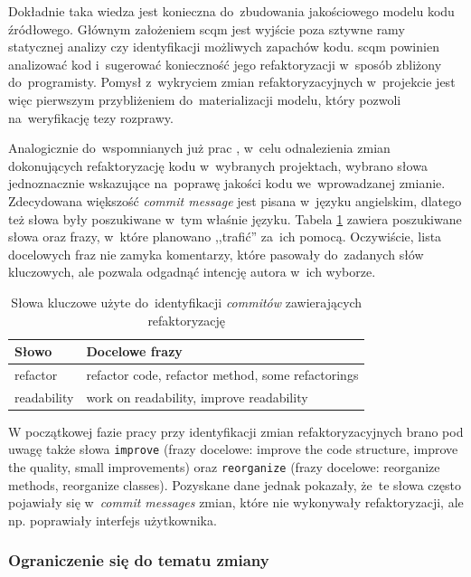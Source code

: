 \documentclass[twoside]{praca}
\begin{document}
Dokładnie taka wiedza jest konieczna do~zbudowania jakościowego modelu kodu źródłowego. Głównym założeniem \gls{scqm} jest wyjście poza sztywne ramy statycznej analizy czy identyfikacji możliwych zapachów kodu. \gls{scqm} powinien analizować kod i~sugerować konieczność jego refaktoryzacji w~sposób zbliżony do~programisty. Pomysł z~wykryciem zmian refaktoryzacyjnych w~projekcie jest więc pierwszym przybliżeniem do~materializacji modelu, który pozwoli na~weryfikację tezy rozprawy.

Analogicznie do~wspomnianych już prac \cite{ray2014large, shimagaki2016commits}, w~celu odnalezienia zmian dokonujących refaktoryzację kodu w~wybranych projektach, wybrano słowa jednoznacznie wskazujące na~poprawę jakości kodu we~wprowadzanej zmianie. Zdecydowana większość \textit{commit message} jest pisana w~języku angielskim, dlatego też słowa były poszukiwane w~tym właśnie języku. Tabela \ref{tbl:impl:keywords} zawiera poszukiwane słowa oraz frazy, w~które planowano ,,trafić'' za~ich pomocą. Oczywiście, lista docelowych fraz nie zamyka komentarzy, które pasowały do~zadanych słów kluczowych, ale pozwala odgadnąć intencję autora w~ich wyborze.

\begin{table}[h]
\centering
\caption{Słowa kluczowe użyte do~identyfikacji \textit{commitów} zawierających refaktoryzację}
\label{tbl:impl:keywords}
\begin{tabular}{|l|l|}
  \hline 
  \textbf{Słowo} & \textbf{Docelowe frazy} \\ \hline
  refactor & refactor code, refactor method, some refactorings \\ \hline
  readability & work on readability, improve readability \\ \hline
\end{tabular} 
\end{table}

W początkowej fazie pracy przy identyfikacji zmian refaktoryzacyjnych brano pod uwagę także słowa \texttt{improve} (frazy docelowe: improve the code structure, improve the quality, small improvements) oraz \texttt{reorganize} (frazy docelowe: reorganize methods, reorganize classes). Pozyskane dane jednak pokazały, że~te słowa często pojawiały się w~\textit{commit messages} zmian, które nie wykonywały refaktoryzacji, ale np. poprawiały interfejs użytkownika.

\subsubsection{Ograniczenie się do tematu zmiany}
\end{document}
